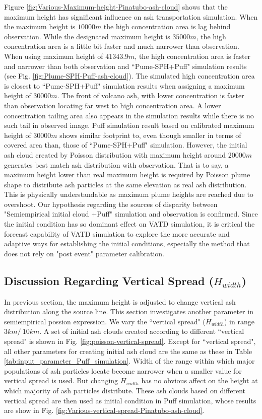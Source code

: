 \documentclass[draft,linenumbers]{agujournal2019}
\begin{document}
Figure \ref{fig:Various-Maximum-height-Pinatubo-ash-cloud} shows that the maximum height has significant influence on ash transportation simulation. When the maximum height is $10000 m$ the high concentration area is lag behind observation. While the designated maximum height is $35000 m$, the high concentration area is a little bit faster and much narrower than observation. When using maximum height of $41343.9 m$, the high concentration area is faster and narrower than both observation and ``Pume-SPH+Puff" simulation results (see Fig. \ref{fig:Plume-SPH-Puff-ash-cloud}). The simulated high concentration area is closest to ``Pume-SPH+Puff" simulation results when assigning a maximum height of $30000 m$. The front of volcano ash, with lower concentration is faster than observation locating far west to high concentration area. A lower concentration tailing area also appears in the simulation results while there is no such tail in observed image. Puff simulation result based on calibrated maximum height of $30000 m$ shows similar footprint to, even though smaller in terms of covered area than, those of ``Pume-SPH+Puff" simulation. However, the initial ash cloud created by Poisson distribution with maximum height around  $20000 m$ generates best match ash distribution with observation. That is to say, a maximum height lower than real maximum height is required by Poisson plume shape to distribute ash particles at the same elevation as real ash distribution. This is physically understandable as maximum plume heights are reached due to overshoot. 
Our hypothesis regarding the sources of disparity between "Semiempirical initial cloud +Puff" simulation and observation is confirmed. Since the initial condition has so dominant effect on VATD simulation, it is critical the forecast capability of VATD simulation to explore the more accurate and adaptive ways for establishing the initial conditions, especially the method that does not rely on "post event" parameter calibration.

\subsection{Discussion Regarding Vertical Spread ($H_{width}$)}
In previous section, the maximum height is adjusted to change vertical ash distribution along the source line. This section investigates another parameter in semiempirical possion expression. We vary the ``vertical spread" ($H_{width}$) in range $3 km /~ 10 km$. A set of initial ash clouds created according to different ``vertical spread" is shown in Fig. \ref{fig:poisson-vertical-spread}. Except for ``vertical spread", all other parameters for creating initial ash cloud are the same as these in Table \ref{tab:input_parameter_Puff_simulation}. Width of the range within which major populations of ash particles locate become narrower when a smaller value for vertical spread is used. But changing $H_{width}$ has no obvious affect on the height at which majority of ash particles distribute. These ash clouds based on different vertical spread are then used as initial condition in Puff simulation, whose results are show in Fig. \ref{fig:Various-vertical-spread-Pinatubo-ash-cloud}.
\end{document}
